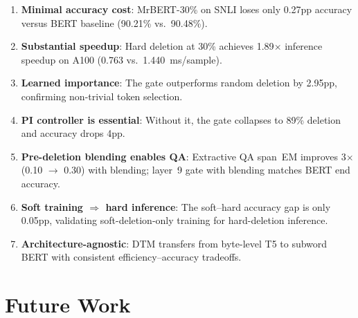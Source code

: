 \begin{enumerate}[nosep]
    \item \textbf{Minimal accuracy cost}: MrBERT-30\% on SNLI loses only 0.27pp accuracy versus BERT baseline (90.21\% vs.\ 90.48\%).
    \item \textbf{Substantial speedup}: Hard deletion at 30\% achieves 1.89$\times$ inference speedup on A100 (0.763 vs.\ 1.440~ms/sample).
    \item \textbf{Learned importance}: The gate outperforms random deletion by 2.95pp, confirming non-trivial token selection.
    \item \textbf{PI controller is essential}: Without it, the gate collapses to 89\% deletion and accuracy drops 4pp.
    \item \textbf{Pre-deletion blending enables QA}: Extractive QA span~EM improves 3$\times$ (0.10 $\to$ 0.30) with blending; layer~9 gate with blending matches BERT end accuracy.
    \item \textbf{Soft training $\Rightarrow$ hard inference}: The soft--hard accuracy gap is only 0.05pp, validating soft-deletion-only training for hard-deletion inference.
    \item \textbf{Architecture-agnostic}: DTM transfers from byte-level T5 to subword BERT with consistent efficiency--accuracy tradeoffs.
\end{enumerate}


\section{Future Work}
\label{sec:future-work}


